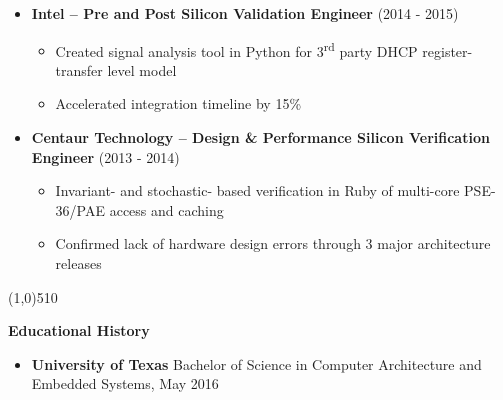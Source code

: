\documentclass{report}
\newcommand{\cut}{\begin{center} \line(1,0){510} \end{center}}
\begin{document}
\begin{itemize}[label=$\cdot$]
\item \textbf{Intel -- Pre and Post Silicon Validation Engineer} (2014 - 2015)
  \begin{itemize}[label=$\circ$]
  \item Created signal analysis tool in Python for 3\textsuperscript{rd} party DHCP register-transfer level model
  \item Accelerated integration timeline by 15\%
  \end{itemize}

\item \textbf{Centaur Technology -- Design \& Performance Silicon Verification Engineer} (2013 - 2014)
  \begin{itemize}[label=$\circ$]
  \item Invariant- and stochastic- based verification in Ruby of multi-core PSE-36/PAE access and caching
  \item Confirmed lack of hardware design errors through 3 major architecture releases
  \end{itemize}

\end{itemize}

\cut{}

\textbf{Educational History}
\begin{itemize}[label=$\cdot$]
\item \textbf{University of Texas} Bachelor of Science in Computer Architecture and Embedded Systems, May 2016
\end{itemize}
\end{document}
